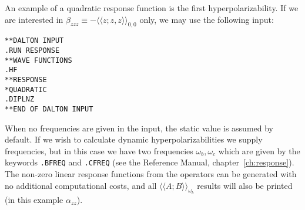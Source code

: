 \begin{center}
\end{center}

An example of a quadratic response function
is the first 
hyperpolarizability. If we are
interested in
$\beta_{zzz}\equiv-\langle\!\langle z;z,z\rangle\!\rangle_{0,0}$ 
only, we may use the following input:
\begin{verbatim}
**DALTON INPUT
.RUN RESPONSE
**WAVE FUNCTIONS
.HF
**RESPONSE
*QUADRATIC
.DIPLNZ
**END OF DALTON INPUT
\end{verbatim}
When no frequencies are given in the input, the static value is assumed by
default. If we wish to calculate dynamic hyperpolarizabilities we supply
frequencies, but in this case we have two frequencies
$\omega_b, \omega_c$ which are given by the keywords \texttt{.BFREQ} and
{\tt .CFREQ} (see the Reference Manual, chapter~\ref{ch:response}).
The non-zero linear response functions from the operators can be
generated with no additional computational costs, and all
$\langle\!\langle A;B\rangle\!\rangle_{\omega_b}$ results
will also be printed (in this example $\alpha_{zz}$).

